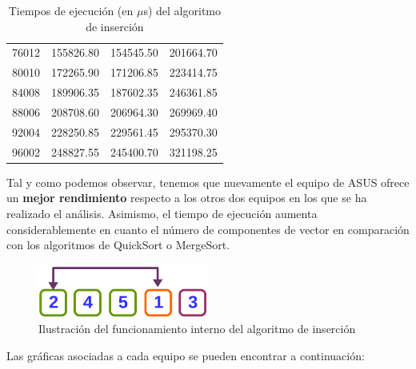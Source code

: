 \documentclass{homework}
\begin{document}
\begin{table}[h]
\begin{tabular}{|r|r|r|r|}
            76012 & 155826.80 & 154545.50 & 201664.70 \\ 
            80010 & 172265.90 & 171206.85 & 223414.75 \\ 
            84008 & 189906.35 & 187602.35 & 246361.85 \\ 
            88006 & 208708.60 & 206964.30 & 269969.40 \\ 
            92004 & 228250.85 & 229561.45 & 295370.30 \\ 
            96002 & 248827.55 & 245400.70 & 321198.25 \\ 
            \hline
        \end{tabular}
        \caption{Tiempos de ejecución (en $\mu$s) del algoritmo de inserción}
    \end{table}

    Tal y como podemos observar, tenemos que nuevamente el equipo de ASUS ofrece un \textbf{mejor rendimiento} respecto a los otros
    dos equipos en los que se ha realizado el análisis. Asimismo, el tiempo de ejecución aumenta considerablemente
    en cuanto el número de componentes de vector en comparación con los algoritmos de QuickSort o MergeSort. 

    \begin{figure}[h]
        \centering
        \includegraphics[width=0.5\textwidth]{img/insercion.png}
        \caption{Ilustración del funcionamiento interno del algoritmo de inserción}
    \end{figure}

    Las gráficas asociadas a cada equipo se pueden encontrar a continuación:
\end{document}
